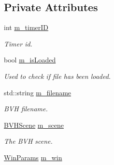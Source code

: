 \subsection*{Private Attributes}
\begin{DoxyCompactItemize}
\item 
int \hyperlink{class_n_g_l_scene_a40a930670746d21518278cf19f811eb7}{m\+\_\+timer\+ID}\hypertarget{class_n_g_l_scene_a40a930670746d21518278cf19f811eb7}{}\label{class_n_g_l_scene_a40a930670746d21518278cf19f811eb7}

\begin{DoxyCompactList}\small\item\em Timer id. \end{DoxyCompactList}\item 
bool \hyperlink{class_n_g_l_scene_a9fa0340bd882fffa1723b15d66b492ca}{m\+\_\+is\+Loaded}\hypertarget{class_n_g_l_scene_a9fa0340bd882fffa1723b15d66b492ca}{}\label{class_n_g_l_scene_a9fa0340bd882fffa1723b15d66b492ca}

\begin{DoxyCompactList}\small\item\em Used to check if file has been loaded. \end{DoxyCompactList}\item 
std\+::string \hyperlink{class_n_g_l_scene_a50700af79af03056626a21f6c9e80f6e}{m\+\_\+filename}\hypertarget{class_n_g_l_scene_a50700af79af03056626a21f6c9e80f6e}{}\label{class_n_g_l_scene_a50700af79af03056626a21f6c9e80f6e}

\begin{DoxyCompactList}\small\item\em B\+VH filename. \end{DoxyCompactList}\item 
\hyperlink{class_b_v_h_scene}{B\+V\+H\+Scene} \hyperlink{class_n_g_l_scene_a390c0987890b10b3426f7513fd930e96}{m\+\_\+scene}\hypertarget{class_n_g_l_scene_a390c0987890b10b3426f7513fd930e96}{}\label{class_n_g_l_scene_a390c0987890b10b3426f7513fd930e96}

\begin{DoxyCompactList}\small\item\em The B\+VH scene. \end{DoxyCompactList}\item 
\hyperlink{struct_win_params}{Win\+Params} \hyperlink{class_n_g_l_scene_aeb9511306d65832ea907ed148726e23b}{m\+\_\+win}\hypertarget{class_n_g_l_scene_aeb9511306d65832ea907ed148726e23b}{}\label{class_n_g_l_scene_aeb9511306d65832ea907ed148726e23b}


\end{DoxyCompactItemize}
